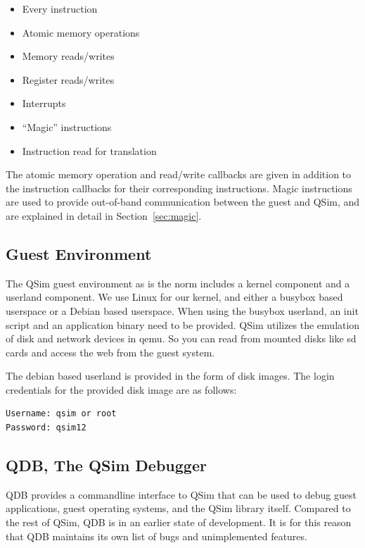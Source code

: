 \documentclass[letterpaper, 10pt]{book}
\begin{document}
\begin{itemize}
  \item{Every instruction}
  \item{Atomic memory operations}
  \item{Memory reads/writes}
  \item{Register reads/writes}
  \item{Interrupts}
  \item{``Magic'' instructions}
  \item{Instruction read for translation}
\end{itemize}

The atomic memory operation and read/write callbacks are given in addition to
the instruction callbacks for their corresponding instructions. Magic
instructions are used to provide out-of-band communication between the guest and
QSim, and are explained in detail in Section~\ref{sec:magic}.

\subsection{Guest Environment}

The QSim guest environment as is the norm includes a kernel component and a
userland component. We use Linux for our kernel, and either a busybox based
userspace or a Debian based userspace. When using the busybox userland, an init
script and an application binary need to be provided. QSim utilizes the emulation of
disk and network devices in qemu. So you can read from mounted disks like sd
cards and access the web from the guest system.

The debian based userland is provided in the form of disk images. The login
credentials for the provided disk image are as follows:

\begin{lstlisting}[frame=none]
Username: qsim or root
Password: qsim12
\end{lstlisting}

\subsection{QDB, The QSim Debugger}

QDB provides a commandline interface to QSim that can be used to debug guest
applications, guest operating systems, and the QSim library itself. Compared to
the rest of QSim, QDB is in an earlier state of development. It is for this
reason that QDB maintains its own list of bugs and unimplemented features.
\end{document}
